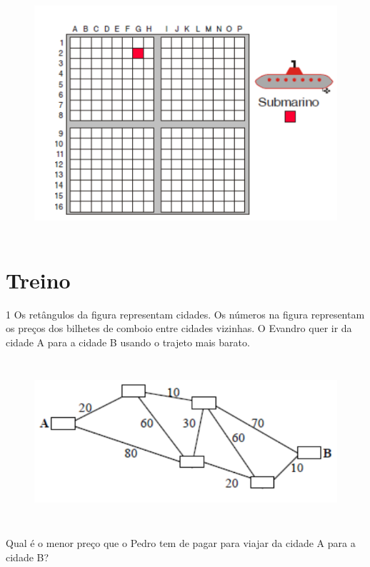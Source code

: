 \begin{figure}[h]
\centering\includegraphics[width=5in,height=3.55208in]{./imgSAEB_6_MAT/media/image73.png}
\end{figure}


\section{Treino}

\num{1}  Os retângulos da figura representam cidades. Os números na figura
representam os preços dos bilhetes de comboio entre cidades vizinhas. O
Evandro quer ir da cidade A para a cidade B usando o trajeto mais
barato.

\begin{figure}[h]
\centering\includegraphics[width=5.90625in,height=2.38542in]{./imgSAEB_6_MAT/media/image74.png}
\end{figure}

\noindent Qual é o menor preço que o Pedro tem de pagar para viajar da cidade A
para a cidade B?

